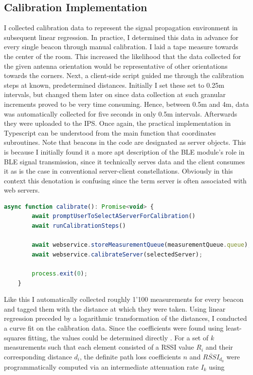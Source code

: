 \documentclass[a4paper, oneside]{ipsreport}
\begin{document}
\newpage
\subsection{Calibration Implementation}
I collected calibration data to represent the signal propagation environment in subsequent linear regression. In practice, I determined this data in advance for every single beacon through manual calibration. I laid a tape measure towards the center of the room. This increased the likelihood that the data collected for the given antenna orientation would be representative of other orientations towards the corners. Next, a client-side script guided me through the calibration steps at known, predetermined distances. Initially I set these set to 0.25m intervals, but changed them later on since data collection at such granular increments proved to be very time consuming. Hence, between 0.5m and 4m, data was automatically collected for five seconds in only 0.5m intervals. Afterwards they were uploaded to the IPS. Once again, the practical implementation in Typescript can be understood from the main function that coordinates subroutines. Note that beacons in the code are designated as server objects. This is because I initially found it a more apt description of the BLE module's role in BLE signal transmission, since it technically serves data and the client consumes it as is the case in conventional server-client constellations. Obviously in this context this denotation is confusing since the term server is often associated with web servers.

\begin{lstlisting}[language=JavaScript, caption=Calibration Function]
	async function calibrate(): Promise<void> {
		await promptUserToSelectAServerForCalibration()
		await runCalibrationSteps()

		await webservice.storeMeasurementQueue(measurementQueue.queue);
		await webservice.calibrateServer(selectedServer);

		process.exit(0);
	}
\end{lstlisting}


Like this I automatically collected roughly 1'100 measurements for every beacon and tagged them with the distance at which they were taken. Using linear regression preceded by a logarithmic transformation of the distances, I conducted a curve fit on the calibration data. Since the coefficients were found using least-squares fitting, the values could be determined directly \cite{WolframAlpha}. For a set of $k$ measurements such that each element consisted of a RSSI value $R_i$ and their corresponding distance $d_i$, the definite path loss coefficients $n$ and $\overline{RSSI}_{d_0}$ were programmatically computed via an intermediate attenuation rate $I_k$ using
\end{document}
